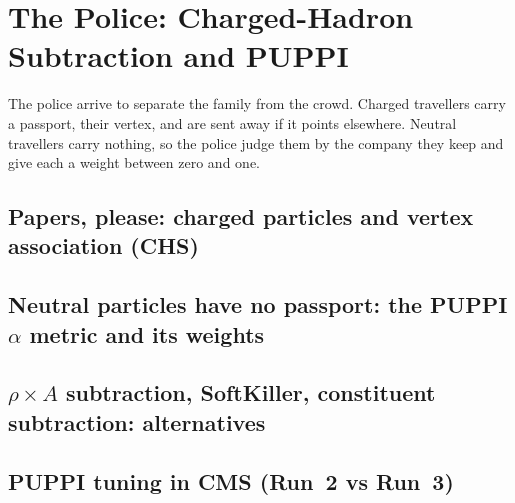 \chapter{The Police: Charged-Hadron Subtraction and PUPPI}
\label{ch:the_police}

\begin{journeybox}
The police arrive to separate the family from the crowd. Charged travellers
carry a passport, their vertex, and are sent away if it points elsewhere.
Neutral travellers carry nothing, so the police judge them by the company they
keep and give each a weight between zero and one.
\end{journeybox}


\section{Papers, please: charged particles and vertex association (CHS)}
\label{sec:the_police:papers_please_charged_particles_and_vert}

\section{Neutral particles have no passport: the PUPPI $\alpha$ metric and its weights}
\label{sec:the_police:neutral_particles_have_no_passport_the_p}

\section{$\rho\times A$ subtraction, SoftKiller, constituent subtraction: alternatives}
\label{sec:the_police:rhotimes_a_subtraction_softkiller_consti}

\section{PUPPI tuning in CMS (Run~2 vs Run~3)}
\label{sec:the_police:puppi_tuning_in_cms_run_2_vs_run_3}

